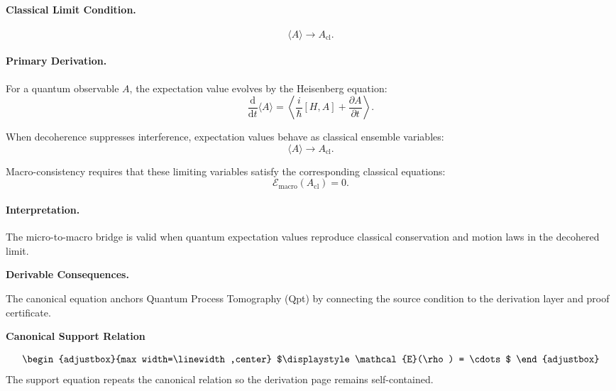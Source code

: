 \paragraph{Classical Limit Condition.}
\begin{equation}
\langle A\rangle
\longrightarrow
A_{\mathrm{cl}} .
\end{equation}

\paragraph{Primary Derivation.}
For a quantum observable $A$, the expectation value evolves by the Heisenberg equation:
\begin{equation}
\frac{\mathrm{d}}{\mathrm{d}t}\langle A\rangle
=
\left\langle
\frac{i}{\hbar}[H,A]
+
\frac{\partial A}{\partial t}
\right\rangle .
\end{equation}

When decoherence suppresses interference, expectation values behave as classical ensemble variables:
\begin{equation}
\langle A\rangle
\rightarrow
A_{\mathrm{cl}}.
\end{equation}

Macro-consistency requires that these limiting variables satisfy the corresponding classical equations:
\begin{equation}
\boxed{
\mathcal{E}_{\mathrm{macro}}(A_{\mathrm{cl}})=0 .
}
\end{equation}

\paragraph{Interpretation.}
The micro-to-macro bridge is valid when quantum expectation values reproduce classical conservation and motion laws in the decohered limit.

\par\vspace{0.35em}
\noindent\textbf{Derivable Consequences.}\quad
\begingroup
\footnotesize
\raggedright
The canonical equation anchors Quantum Process Tomography (Qpt) by connecting the source condition to the derivation layer and proof certificate.
\par\endgroup

\noindent\textbf{Canonical Support Relation}\par
\[
\begin{adjustbox}{max width=\linewidth,center}
$\displaystyle
\mathcal{E}(\rho) = \cdots
$
\end{adjustbox}
\]
\noindent The support equation repeats the canonical relation so the derivation page remains self-contained.\par

